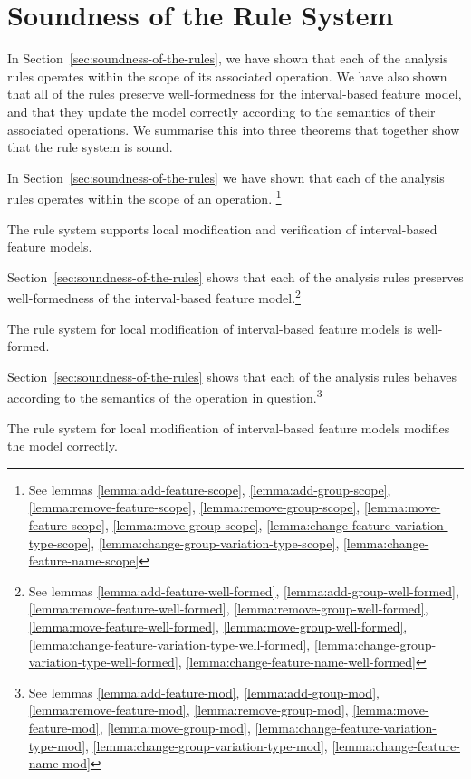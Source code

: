 \section{Soundness of the Rule System}
In Section~\vref{sec:soundness-of-the-rules}, we have shown that each of the analysis rules operates within the scope of its associated operation. We have also shown that all of the rules preserve well-formedness for the interval-based feature model, and that they update the model correctly according to the semantics of their associated operations. We summarise this into three theorems that together show that the rule system is sound.

In Section~\vref{sec:soundness-of-the-rules} we have shown that each of the analysis rules operates within the scope of an operation. \footnote{See lemmas \ref{lemma:add-feature-scope}, \ref{lemma:add-group-scope}, \ref{lemma:remove-feature-scope}, \ref{lemma:remove-group-scope}, \ref{lemma:move-feature-scope}, \ref{lemma:move-group-scope}, \ref{lemma:change-feature-variation-type-scope}, \ref{lemma:change-group-variation-type-scope}, \ref{lemma:change-feature-name-scope}}
\\
\begin{theorem}
  The rule system supports local modification and verification of interval-based feature models.
\end{theorem}

Section~\vref{sec:soundness-of-the-rules} shows that each of the analysis rules preserves well-formedness of the interval-based feature model.\footnote{See lemmas \ref{lemma:add-feature-well-formed}, \ref{lemma:add-group-well-formed}, \ref{lemma:remove-feature-well-formed}, \ref{lemma:remove-group-well-formed}, \ref{lemma:move-feature-well-formed}, \ref{lemma:move-group-well-formed}, \ref{lemma:change-feature-variation-type-well-formed}, \ref{lemma:change-group-variation-type-well-formed}, \ref{lemma:change-feature-name-well-formed}}
\\
\begin{theorem}
  The rule system for local modification of interval-based feature models is well-formed.
\end{theorem}

Section~\vref{sec:soundness-of-the-rules} shows that each of the analysis rules behaves according to the semantics of the operation in question.\footnote{See lemmas \ref{lemma:add-feature-mod}, \ref{lemma:add-group-mod}, \ref{lemma:remove-feature-mod}, \ref{lemma:remove-group-mod}, \ref{lemma:move-feature-mod}, \ref{lemma:move-group-mod}, \ref{lemma:change-feature-variation-type-mod}, \ref{lemma:change-group-variation-type-mod}, \ref{lemma:change-feature-name-mod}}
\\
\begin{theorem}
  The rule system for local modification of interval-based feature models modifies the model correctly.
\end{theorem}
